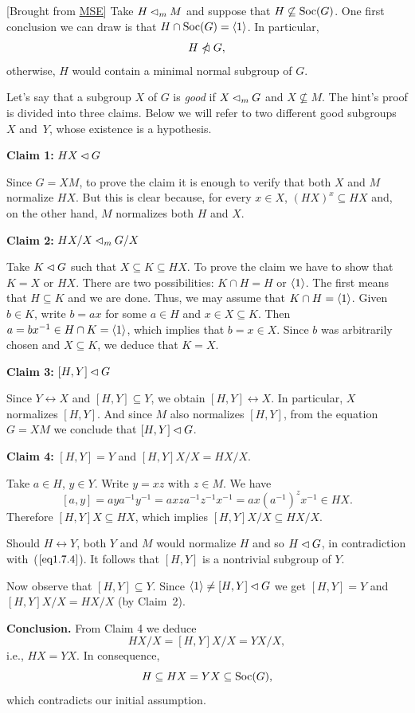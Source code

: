 \begin{solution} {[Brought from \href{https://math.stackexchange.com/a/1220274/269050}{MSE}]} Take $H\lhd_mM$ and suppose that $H\not\subseteq{\rm Soc}(G)$. One first conclusion we can draw is that $H\cap{\rm Soc}(G)=\langle1\rangle$. In particular, 
\begin{equation}\label{eq1.7.4}
    H\nnormal G,
\end{equation}
otherwise, $H$ would contain a minimal normal subgroup of $G$.

Let's say that a subgroup $X$ of $G$ is \textsl{good} if $X\lhd_mG$ and $X\not\subseteq M$. The hint's proof is divided into three claims. Below we will refer to two different good subgroups~$X$ and~$Y$, whose existence is a hypothesis.

\textbf{Claim 1:} $HX\lhd G$

{\small Since $G=XM$, to prove the claim it is enough to verify that both $X$ and $M$ normalize $HX$. But this is clear because, for every $x\in X$, $(HX)^x\subseteq HX$ and, on the other hand, $M$ normalizes both $H$ and $X$.}

\medskip

\textbf{Claim 2:} $HX/X\lhd_mG/X$

{\small Take $K\lhd G$ such that $X\subseteq K\subseteq HX$. To prove the claim we have to show that $K=X$ or $HX$. There are two possibilities: $K\cap H=H$ or $\langle1\rangle$. The first means that $H\subseteq K$ and we are done. Thus, we may assume that $K\cap H=\langle1\rangle$. Given $b\in K$, write $b=ax$ for some $a\in H$ and $x\in X\subseteq K$. Then $a=bx^{-1}\in H\cap K=\langle1\rangle$, which implies that $b=x\in X$. Since $b$ was arbitrarily chosen and $X\subseteq K$, we deduce that $K=X$.}

\medskip

\textbf{Claim 3:} $[H,Y]\lhd G$

{\small Since $Y\leftrightarrow X$ and $[H,Y]\subseteq Y$, we obtain $[H,Y]\leftrightarrow X$. In particular, $X$ normalizes $[H,Y]$. And since $M$ also normalizes $[H,Y]$, from the equation $G=XM$ we conclude that $[H,Y] \lhd G$.
}

\medskip

\textbf{Claim 4:} $[H,Y]=Y$ and $[H,Y]X/X= HX/X$.

{\small Take $a\in H$, $y\in Y$. Write $y=xz$ with $z\in M$. We have
$$
    [a,y]=aya^{-1}y^{-1}=axza^{-1}z^{-1}x^{-1}
        = ax(a^{-1})^zx^{-1}\in HX.
$$
Therefore $[H,Y]X\subseteq HX$, which implies $[H,Y]X/X\subseteq HX/X$. 

Should $H\leftrightarrow Y$, both $Y$ and $M$ would normalize $H$ and so $H\lhd G$, in contradiction with~($\ref{eq1.7.4}$). It follows that $[H,Y]$ is a nontrivial subgroup of $Y$.

Now observe that $[H,Y]\subseteq Y$. Since $\langle1\rangle\ne[H,Y]\lhd G$ we get $[H,Y]=Y$ and $[H,Y]X/X=HX/X$ (by Claim~2).}

\medskip

\textbf{Conclusion.} From Claim 4 we deduce
$$
    HX/X=[H,Y]X/X = YX/X,
$$
i.e., $HX=YX$. In consequence,
$$
    H \subseteq HX = YX\subseteq{\rm Soc}(G),
$$
which contradicts our initial assumption.  \end{solution}

